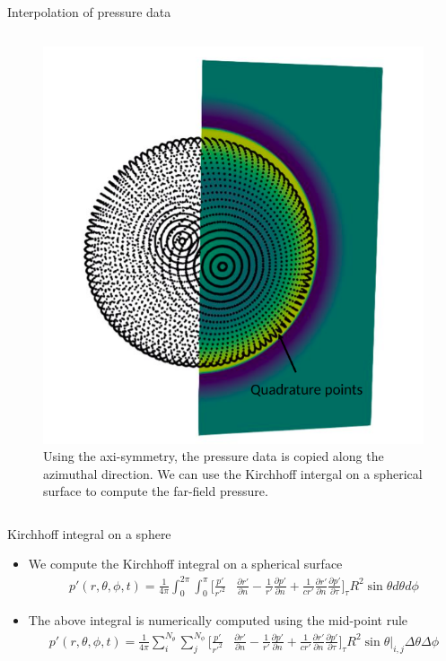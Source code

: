 \documentclass[10pt, aspectratio=169]{beamer}
\begin{document}
\begin{frame}{Interpolation of pressure data}
\begin{columns}
\begin{figure}
			\includegraphics[scale=0.21]{images/sphere.png}
			\caption*{Using the axi-symmetry, the pressure data is copied along the azimuthal direction. We can use the Kirchhoff intergal on a spherical surface to compute the far-field pressure.}
		\end{figure}
	\end{columns}
\end{frame}

\begin{frame}{Kirchhoff integral on a sphere}
	\begin{itemize}
		\item We compute the Kirchhoff integral on a spherical surface 
		\begin{equation}
			\begin{split}
				p'(r, \theta, \phi,t) =  \frac{1}{4\pi}\int_{0}^{2\pi}\int_{0}^{\pi}\Big[  \frac{p'}{r'^{2}}&\frac{\partial r'}{\partial n} - \frac{1}{r'}\frac{\partial p'}{\partial n} + \frac{1}{c r'}\frac{\partial r'}{\partial n}\frac{\partial p'}{\partial \tau} \Big]_{\tau} R^2\sin\theta d\theta d \phi  
			\end{split} 
		\end{equation}
		\item The above integral is numerically computed using the mid-point rule 
		\begin{equation}
			\begin{split}
				p'(r, \theta, \phi,t) =  \frac{1}{4\pi} \sum_{i}^{N_{\theta}}\sum_{j}^{N_{\phi}}  \Big[  \frac{p'}{r'^{2}}&\frac{\partial r'}{\partial n} - \frac{1}{r'}\frac{\partial p'}{\partial n} + \frac{1}{c r'}\frac{\partial r'}{\partial n}\frac{\partial p'}{\partial \tau} \Big]_{\tau} R^2\sin\theta \Big|_{i, j} \Delta \theta \Delta \phi  
			\end{split} 
		\end{equation}
	\end{itemize}
\end{frame}
\end{document}
